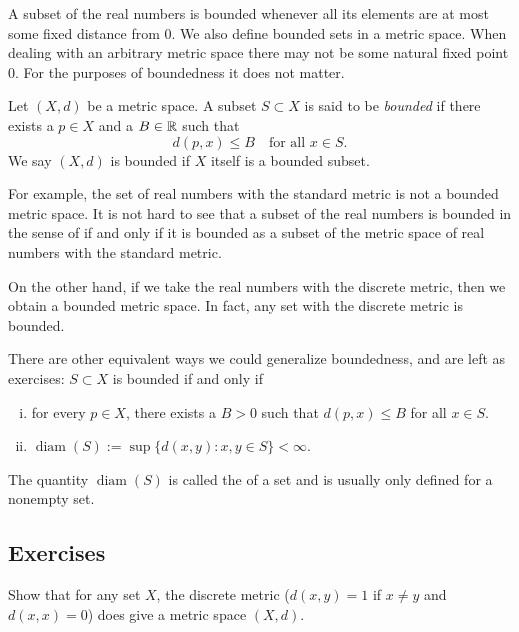 \medskip

A subset of the real
numbers is bounded whenever all its elements are at most some fixed distance
from 0.
We also define bounded sets in a metric space.
When dealing with an arbitrary metric space there may not be some
natural fixed point 0.  For the purposes of boundedness it does not matter.

\begin{defn}
Let $(X,d)$ be a metric space.  A subset $S \subset X$ is said to be
\emph{bounded} if there exists a $p \in X$ and a
$B \in {\mathbb{R}}$ such that
\begin{equation*}
d(p,x) \leq B \quad \text{for all $x \in S$}.
\end{equation*}
We say $(X,d)$ is bounded if $X$ itself is a bounded subset.
\end{defn}

For example, the set of real numbers with the standard metric is not a
bounded metric space.  It is not hard to see that a
subset of the real numbers is bounded in the
sense of  if and only if it is bounded as a subset of the
metric space of real numbers with the standard metric.

On the other hand, if we take the real numbers with the discrete metric,
then we obtain a bounded metric space.  In fact, any set with the
discrete metric is bounded.

There are other equivalent ways we could generalize boundedness,
and are left as exercises:  $S \subset X$ is bounded if and only if
\begin{enumerate}[(i)]
\item 
for every $p \in X$, there exists a $B > 0$ such that $d(p,x) \leq B$ for
all $x \in S$.
\item 
$\operatorname{diam}(S) := \sup \{ d(x,y) : x,y \in S \} < \infty$.
\end{enumerate}
The quantity $\operatorname{diam}(S)$ is called the
\emph{} of a set and is usually only defined for
a nonempty set.

\subsection{Exercises}

\begin{exercise}
Show that for any set $X$, the discrete metric ($d(x,y) = 1$ if $x\not=y$ and
$d(x,x) = 0$) does give a metric space $(X,d)$.
\end{exercise}

